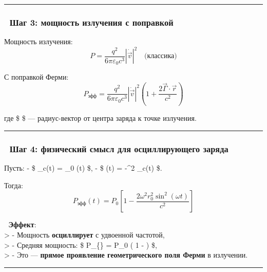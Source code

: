 \documentclass[11pt]{article}
\begin{document}
\begin{center}\rule{0.5\linewidth}{\linethickness}\end{center}

\subsubsection{🔹 Шаг 3: мощность излучения с
поправкой}\label{ux448ux430ux433-3-ux43cux43eux449ux43dux43eux441ux442ux44c-ux438ux437ux43bux443ux447ux435ux43dux438ux44f-ux441-ux43fux43eux43fux440ux430ux432ux43aux43eux439}

Мощность излучения: \[
P = \frac{q^2}{6\pi\varepsilon_0 c^3} |\dot{\vec{v}}|^2 \quad \text{(классика)}
\]

С поправкой Ферми: \[
\boxed{
P_{\text{эфф}} = \frac{q^2}{6\pi\varepsilon_0 c^3} |\dot{\vec{v}}|^2 \left( 1 + \frac{2\vec{\Gamma} \cdot \vec{r}}{c^2} \right)
}
\]

где \$  \$ --- радиус-вектор от центра заряда к точке излучения.

\begin{center}\rule{0.5\linewidth}{\linethickness}\end{center}

\subsubsection{🔹 Шаг 4: физический смысл для осциллирующего
заряда}\label{ux448ux430ux433-4-ux444ux438ux437ux438ux447ux435ux441ux43aux438ux439-ux441ux43cux44bux441ux43b-ux434ux43bux44f-ux43eux441ux446ux438ux43bux43bux438ux440ux443ux44eux449ux435ux433ux43e-ux437ux430ux440ux44fux434ux430}

Пусть: - \$ \_c(t) = \_0 \sin(\omega t) \$, - \$
\vec{\Gamma}(t) = -\omega\^{}2 \_c(t) \$.

Тогда: \[
P_{\text{эфф}}(t) = P_0 \left[ 1 - \frac{2\omega^2 r_0^2 \sin^2(\omega t)}{c^2} \right]
\]

📌 \textbf{Эффект}:\\
\textgreater{} - Мощность \textbf{осциллирует} с удвоенной частотой,\\
\textgreater{} - Средняя мощность: \$ \langle P\_\{\}
\rangle = P\_0 \left( 1 -  \right) \$,\\
\textgreater{} - Это --- \textbf{прямое проявление геометрического поля
Ферми} в излучении.

\begin{center}\rule{0.5\linewidth}{\linethickness}\end{center}
\end{document}
